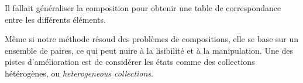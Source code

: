 \documentclass{llncs}
\begin{document}
Il fallait généraliser la composition pour obtenir une table de correspondance entre
les différents éléments.

Même si notre méthode résoud des problèmes de compositions, elle se base sur un
ensemble de paires, ce qui peut nuire à la lisibilité et à la manipulation.
Une des pistes d'amélioration est de considérer les états comme des collections
hétérogènes, ou \emph{heterogeneous collections}.

% 

% 



\end{document}
